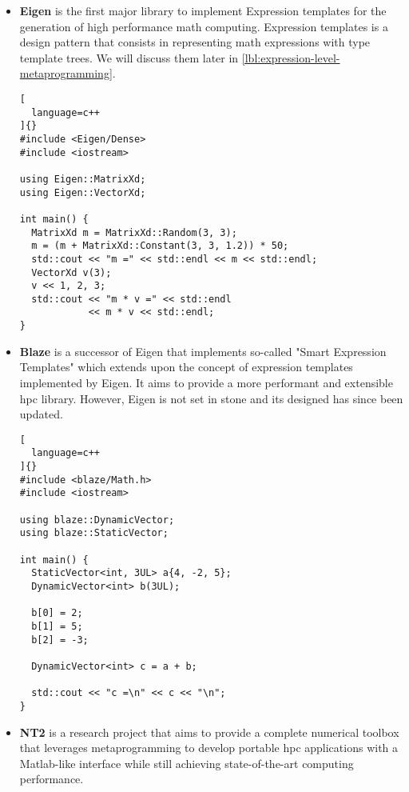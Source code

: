 \documentclass[../main]{subfiles}
\begin{document}
\begin{itemize}

  \item

\textbf{Eigen} \cite{eigen} is the first major \cpp library to implement
Expression templates for the generation of high performance math computing.
Expression templates is a \cpp design pattern that consists in representing
math expressions with type template trees. We will discuss them later
in \ref{lbl:expression-level-metaprogramming}.

\begin{lstlisting}[
  language=c++
]{}
#include <Eigen/Dense>
#include <iostream>

using Eigen::MatrixXd;
using Eigen::VectorXd;

int main() {
  MatrixXd m = MatrixXd::Random(3, 3);
  m = (m + MatrixXd::Constant(3, 3, 1.2)) * 50;
  std::cout << "m =" << std::endl << m << std::endl;
  VectorXd v(3);
  v << 1, 2, 3;
  std::cout << "m * v =" << std::endl
            << m * v << std::endl;
}
\end{lstlisting}

  \item

\textbf{Blaze} \cite{blazelib} is a successor of Eigen that implements so-called
"Smart Expression Templates" which extends upon the concept of
expression templates implemented by Eigen. It aims to provide a more performant
and extensible \gls{hpc} library. However, Eigen is not set in stone
and its designed has since been updated.

\begin{lstlisting}[
  language=c++
]{}
#include <blaze/Math.h>
#include <iostream>

using blaze::DynamicVector;
using blaze::StaticVector;

int main() {
  StaticVector<int, 3UL> a{4, -2, 5};
  DynamicVector<int> b(3UL);

  b[0] = 2;
  b[1] = 5;
  b[2] = -3;

  DynamicVector<int> c = a + b;

  std::cout << "c =\n" << c << "\n";
}
\end{lstlisting}

  \item

\textbf{NT2} \cite{nt2} is a research project that aims to provide a complete
numerical toolbox that leverages metaprogramming to develop portable \gls{hpc}
applications with a Matlab-like interface while still achieving state-of-the-art
computing performance.


\end{itemize}
\end{document}
